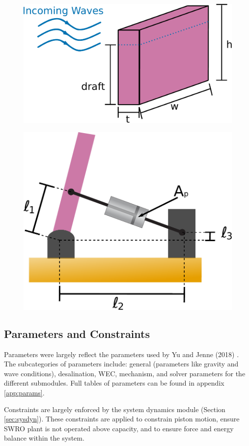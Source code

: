\documentclass[twocolumn,10pt]{asme2e}
\begin{document}
\begin{figure}
    \centering
    \includegraphics[width=0.7\linewidth]{../figs/WECdims.pdf}
    \label{fig:dims}
\end{figure}

\begin{figure}
    \centering
    \includegraphics[width=0.7\linewidth]{../figs/mechanism.pdf}
    \label{fig:mechanism}
\end{figure}

\subsection{Parameters and Constraints}
Parameters were largely reflect the parameters used by Yu and Jenne (2018) \cite{Yu2018}. The subcategories of parameters include: general (parameters like gravity and wave conditions), desalination, WEC, mechanism, and solver parameters for the different submodules. Full tables of parameters can be found in appendix \ref{app:params}.

Constraints are largely enforced by the system dynamics module (Section \ref{sec:sysdyn}). These constraints are applied to constrain piston motion, ensure SWRO plant is not operated above capacity, and to ensure force and energy balance within the system.
\end{document}
